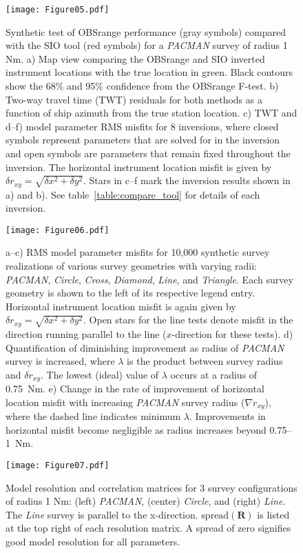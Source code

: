 \begin{figure}[h]
\texttt{[image: Figure05.pdf]}
\caption{ Synthetic test of OBSrange performance (gray symbols) compared with the SIO tool (red symbols) for a \textit{PACMAN} survey of radius 1 Nm. a) Map view comparing the OBSrange and SIO inverted instrument locations with the true location in green. Black contours show the 68\% and 95\% confidence from the OBSrange F-test. b) Two-way travel time (TWT) residuals for both methods as a function of ship azimuth from the true station location. c) TWT and d--f) model parameter RMS misfits for 8 inversions, where closed symbols represent parameters that are solved for in the inversion and open symbols are parameters that remain fixed throughout the inversion. The horizontal instrument location misfit is given by $\delta r_{xy} = \sqrt{\delta x^2 + \delta y^2} $. Stars in c--f mark the inversion results shown in a) and b). See table~\ref{table:compare_tool} for details of each inversion.}
\label{fig:compare_tool}
\end{figure}

\newpage

\begin{figure}[h]
\texttt{[image: Figure06.pdf]}
\caption{ a--c) RMS model parameter misfits for 10,000 synthetic survey realizations of various survey geometries with varying radii: \textit{PACMAN}, \textit{Circle}, \textit{Cross}, \textit{Diamond}, \textit{Line}, and \textit{Triangle}. Each survey geometry is shown to the left of its respective legend entry. Horizontal instrument location misfit is again given by $\delta r_{xy} = \sqrt{\delta x^2 + \delta y^2} $. Open stars for the line tests denote misfit in the direction running parallel to the line ($x$-direction for these tests). d) Quantification of diminishing improvement as radius of \textit{PACMAN} survey is increased, where $\lambda$ is the product between survey radius and $\delta r_{xy}$. The lowest (ideal) value of $\lambda$ occurs at a radius of 0.75~Nm. e) Change in the rate of improvement of horizontal location misfit with increasing \textit{PACMAN} survey radius ($\nabla r_{xy}$), where the dashed line indicates minimum $\lambda$. Improvements in horizontal misfit become negligible as radius increases beyond 0.75--1~Nm.}
\label{fig:survey_geom_explore}
\end{figure}

\newpage

\begin{figure}[h]
\texttt{[image: Figure07.pdf]}
\caption{ Model resolution and correlation matrices for 3 survey configurations of radius 1 Nm: (left) \textit{PACMAN}, (center) \textit{Circle}, and (right) \textit{Line}. The \textit{Line} survey is parallel to the x-direction. $\text{spread}(\mathbf{R})$ is listed at the top right of each resolution matrix. A spread of zero signifies good model resolution for all parameters. }
\label{fig:resolution_correlation}
\end{figure}